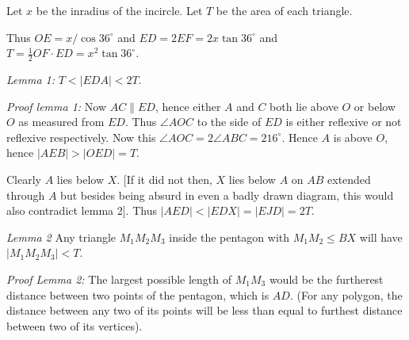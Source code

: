 \documentclass[12pt]{article}
\begin{document}
\begin{enumerate}[topsep=\bigskipamount,itemsep=\bigskipamount,leftmargin=0pt]
Let $x$ be the inradius of the incircle.
Let $T$ be the area of each triangle.

Thus $OE = x/\cos 36^\circ$ and $ED = 2EF = 2x \tan 36^\circ$
and $T = \frac{1}{2} OF\cdot ED = x^2 \tan 36^\circ$.

\textit{Lemma 1:}
$T < |EDA| < 2T$.

\textit{Proof lemma 1:}
Now $AC\parallel ED$, hence either $A$ and $C$ both lie above $O$ or below $O$
as measured from $ED$.
Thus $\angle AOC$ to the side of $ED$ is either reflexive or not reflexive respectively.
Now this $\angle AOC = 2\angle ABC = 216^\circ$.
Hence $A$ is above $O$,
hence $|AEB| > |OED| = T$.

Clearly $A$ lies below $X$.
[If it did not then, $X$ lies below $A$ on $AB$ extended through $A$ but besides being absurd in even a badly drawn diagram, this would also contradict lemma 2].
Thus $|AED| < |EDX| = |EJD| = 2T$.

\textit{Lemma 2}
Any triangle $M_1 M_2 M_3$ inside the pentagon with $M_1 M_2 \leq BX$ will have $|M_1 M_2 M_3| < T$.

\textit{Proof Lemma 2:}
The largest possible length of $M_1 M_3$ would be the furtherest distance between two points of the pentagon, which is $AD$.
(For any polygon, the distance between any two of its points will be less than equal to furthest distance between two of its vertices).


\end{enumerate}
\end{document}
